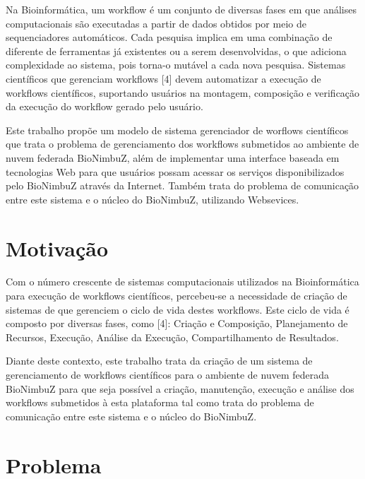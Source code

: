 Na Bioinformática, um workflow é um conjunto de diversas fases em que análises computacionais são executadas a partir de dados obtidos por meio de sequenciadores automáticos. Cada pesquisa implica em uma combinação de diferente de ferramentas já existentes ou a serem desenvolvidas, o que adiciona complexidade ao sistema, pois torna-o mutável a cada nova pesquisa. Sistemas científicos que gerenciam workflows [4] devem automatizar a execução de workflows científicos, suportando usuários na montagem, composição e verificação da execução do workflow gerado pelo usuário.

Este trabalho propõe um modelo de sistema gerenciador de worflows científicos que trata o problema de gerenciamento dos workflows submetidos ao ambiente de nuvem federada BioNimbuZ, além de implementar uma interface baseada em tecnologias Web para que usuários possam acessar os serviços disponibilizados pelo BioNimbuZ através da Internet. Também trata do problema de comunicação entre este sistema e o núcleo do BioNimbuZ, utilizando Websevices.


\section{Motivação} \label{1title2}

Com o número crescente de sistemas computacionais utilizados na Bioinformática para execução de workflows científicos, percebeu-se a necessidade de criação de sistemas de que gerenciem o ciclo de vida destes workflows. Este ciclo de vida é composto por diversas fases, como [4]: Criação e Composição, Planejamento de Recursos, Execução, Análise da Execução, Compartilhamento de Resultados. 

Diante deste contexto, este trabalho trata da criação de um sistema de gerenciamento de workflows científicos para o ambiente de nuvem federada BioNimbuZ para que seja possível a criação, manutenção, execução e análise dos workflows submetidos à esta plataforma tal como trata do problema de comunicação entre este sistema e o núcleo do BioNimbuZ.

\section{Problema} \label{1title3}

